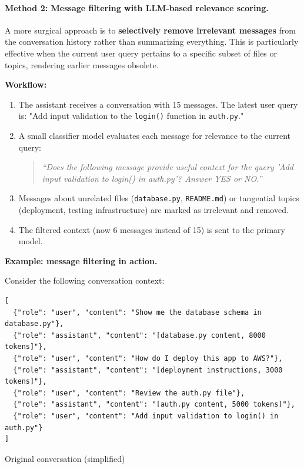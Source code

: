 \documentclass[english]{article}
\begin{document}
\paragraph{Method 2: Message filtering with LLM-based relevance scoring.}

A more surgical approach is to \textbf{selectively remove irrelevant messages} from the conversation history rather than summarizing everything. This is particularly effective when the current user query pertains to a specific subset of files or topics, rendering earlier messages obsolete.

\textbf{Workflow:}
\begin{enumerate}
    \item The assistant receives a conversation with 15 messages. The latest user query is: "Add input validation to the \texttt{login()} function in \texttt{auth.py}."
    \item A small classifier model evaluates each message for relevance to the current query:
    \begin{quote}
    \textit{``Does the following message provide useful context for the query 'Add input validation to login() in auth.py'? Answer YES or NO.''}
    \end{quote}
    \item Messages about unrelated files (\texttt{database.py}, \texttt{README.md}) or tangential topics (deployment, testing infrastructure) are marked as irrelevant and removed.
    \item The filtered context (now 6 messages instead of 15) is sent to the primary model.
\end{enumerate}

\textbf{Example: message filtering in action.}

Consider the following conversation context:

\begin{listing}[H]
\begin{verbatim}
[
  {"role": "user", "content": "Show me the database schema in database.py"},
  {"role": "assistant", "content": "[database.py content, 8000 tokens]"},
  {"role": "user", "content": "How do I deploy this app to AWS?"},
  {"role": "assistant", "content": "[deployment instructions, 3000 tokens]"},
  {"role": "user", "content": "Review the auth.py file"},
  {"role": "assistant", "content": "[auth.py content, 5000 tokens]"},
  {"role": "user", "content": "Add input validation to login() in auth.py"}
]
\end{verbatim}
\caption{Original conversation (simplified)}
\end{listing}
\end{document}
